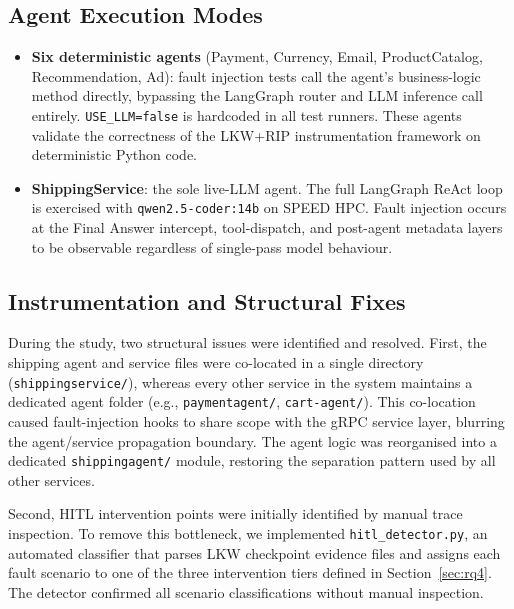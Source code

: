 \documentclass[conference]{IEEEtran}
\begin{document}
\subsection{Agent Execution Modes}

\begin{itemize}
  \item \textbf{Six deterministic agents} (Payment, Currency, Email,
        ProductCatalog, Recommendation, Ad): fault injection tests call the
        agent's business-logic method directly, bypassing the LangGraph router
        and LLM inference call entirely. \texttt{USE\_LLM=false} is hardcoded
        in all test runners. These agents validate the correctness of the
        LKW+RIP instrumentation framework on deterministic Python code.
  \item \textbf{ShippingService}: the sole live-LLM agent. The full LangGraph
        ReAct loop is exercised with \texttt{qwen2.5-coder:14b} on SPEED HPC.
        Fault injection occurs at the Final Answer intercept, tool-dispatch, and
        post-agent metadata layers to be observable regardless of single-pass
        model behaviour.
\end{itemize}

\subsection{Instrumentation and Structural Fixes}
During the study, two structural issues were identified and resolved. First,
the shipping agent and service files were co-located in a single directory
(\texttt{shippingservice/}), whereas every other service in the system maintains
a dedicated agent folder (e.g., \texttt{paymentagent/}, \texttt{cart-agent/}).
This co-location caused fault-injection hooks to share scope with the gRPC
service layer, blurring the agent/service propagation boundary. The agent logic
was reorganised into a dedicated \texttt{shippingagent/} module, restoring the
separation pattern used by all other services.

Second, HITL intervention points were initially identified by manual trace
inspection. To remove this bottleneck, we implemented \texttt{hitl\_detector.py},
an automated classifier that parses LKW checkpoint evidence files and assigns
each fault scenario to one of the three intervention tiers defined in
Section~\ref{sec:rq4}. The detector confirmed all scenario classifications
without manual inspection.

\end{document}
